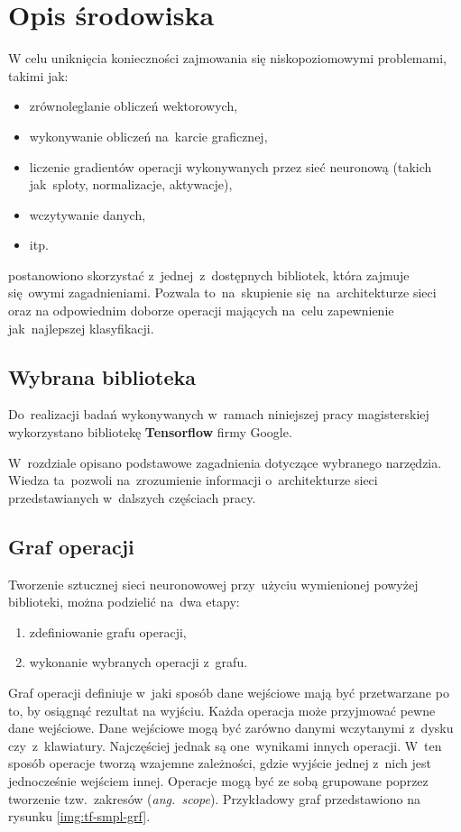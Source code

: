 \chapter{Opis środowiska}
W celu uniknięcia konieczności zajmowania się niskopoziomowymi problemami, takimi jak:
\begin{itemize}
    \item zrównoleglanie obliczeń wektorowych,
    \item wykonywanie obliczeń na~karcie graficznej,
    \item liczenie gradientów operacji wykonywanych przez sieć neuronową (takich jak~sploty, normalizacje, aktywacje),
    \item wczytywanie danych,
    \item itp.
\end{itemize}
postanowiono skorzystać z~jednej~z~dostępnych bibliotek, która zajmuje się~owymi zagadnieniami. Pozwala to~na~skupienie
się~na~architekturze sieci oraz na odpowiednim doborze operacji mających na~celu zapewnienie jak~najlepszej
klasyfikacji.

\section{Wybrana biblioteka}
Do~realizacji badań wykonywanych w~ramach niniejszej pracy magisterskiej wykorzystano bibliotekę
\textbf{Tensorflow} firmy Google.

W~rozdziale opisano podstawowe zagadnienia dotyczące wybranego narzędzia. Wiedza ta~pozwoli na~zrozumienie
informacji o~architekturze sieci przedstawianych w~dalszych częściach pracy.

\section{Graf operacji}
Tworzenie sztucznej sieci neuronowowej przy~użyciu wymienionej powyżej biblioteki, można podzielić na~dwa etapy:
\begin{enumerate}
    \item zdefiniowanie grafu operacji,
    \item wykonanie wybranych operacji z~grafu.
\end{enumerate}

Graf operacji definiuje w~jaki sposób dane wejściowe mają być przetwarzane po to, by osiągnąć rezultat na wyjściu.
Każda operacja może przyjmować pewne dane wejściowe. Dane wejściowe mogą być zarówno danymi wczytanymi z~dysku
czy~z~klawiatury. Najczęściej jednak są one~wynikami innych operacji. W~ten sposób operacje tworzą wzajemne zależności,
gdzie wyjście jednej z~nich jest jednocześnie wejściem innej. Operacje mogą być ze sobą grupowane poprzez tworzenie
tzw.~zakresów (\textit{ang.~scope}). Przykładowy graf przedstawiono na rysunku \ref{img:tf-smpl-grf}.

